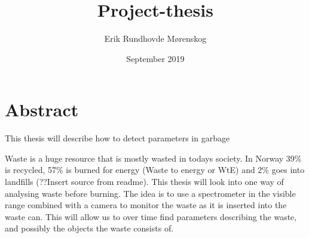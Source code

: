 \documentclass{article}
\title{Project-thesis}
\author{Erik Rundhovde M\o renskog}
\date{September 2019}
\begin{document}
\maketitle

\section{Abstract}
This thesis will describe how to detect parameters in garbage 

Waste is a huge resource that is mostly wasted in todays society. In Norway 39\% is recycled, 57\% is burned for energy (Waste to energy or WtE) and 2\% goes into landfills (??Insert source from readme). This thesis will look into one way of analysing waste before burning. The idea is to use a spectrometer in the visible range combined with a camera to monitor the waste as it is inserted into the waste can. This will allow us to over time find parameters describing the waste, and possibly the objects the waste consists of. 
\end{document}
